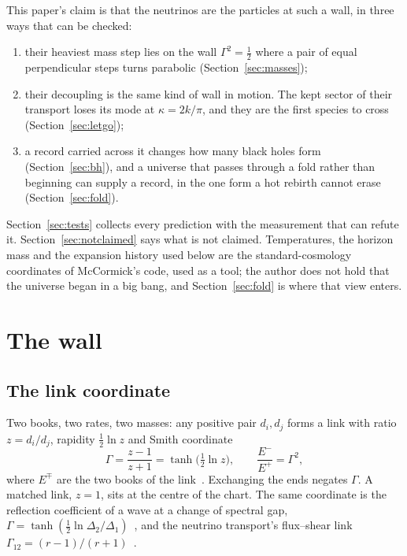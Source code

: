 \documentclass[11pt]{article}
\theoremstyle{definition}\newtheorem{hypothesis}{Hypothesis}\newtheorem{prediction}{Prediction}
\theoremstyle{remark}\newtheorem{remark}[theorem]{Remark}
\begin{document}
This paper's claim is that the neutrinos are the particles at such a wall, in three ways that can be checked:
\begin{enumerate}[nosep]
\item their heaviest mass step lies on the wall $\Gamma^2=\tfrac12$ where a pair of equal perpendicular steps turns parabolic (Section~\ref{sec:masses});
\item their decoupling is the same kind of wall in motion. The kept sector of their transport loses its mode at $\kappa=2k/\pi$, and they are the first species to cross (Section~\ref{sec:letgo});
\item a record carried across it changes how many black holes form (Section~\ref{sec:bh}), and a universe that passes through a fold rather than beginning can supply a record, in the one form a hot rebirth cannot erase (Section~\ref{sec:fold}).
\end{enumerate}
Section~\ref{sec:tests} collects every prediction with the measurement that can refute it. Section~\ref{sec:notclaimed} says what is not claimed. Temperatures, the horizon mass and the expansion history used below are the standard-cosmology coordinates of McCormick's code, used as a tool; the author does not hold that the universe began in a big bang, and Section~\ref{sec:fold} is where that view enters.

\section{The wall}\label{sec:wall}

\subsection{The link coordinate}
Two books, two rates, two masses: any positive pair $d_i,d_j$ forms a link with ratio $z=d_i/d_j$, rapidity $\tfrac12\ln z$ and Smith coordinate
\begin{equation}
\Gamma=\frac{z-1}{z+1}=\tanh\big(\tfrac12\ln z\big),\qquad \frac{E^-}{E^+}=\Gamma^2 ,
\end{equation}
where $E^\mp$ are the two books of the link~\cite{VOTKP,Atlas}. Exchanging the ends negates $\Gamma$. A matched link, $z=1$, sits at the centre of the chart. The same coordinate is the reflection coefficient of a wave at a change of spectral gap, $\Gamma=\tanh(\tfrac12\ln\Delta_2/\Delta_1)$~\cite{BH}, and the neutrino transport's flux--shear link $\Gamma_{12}=(r-1)/(r+1)$~\cite{NU10}.
\end{document}
